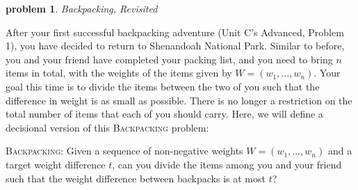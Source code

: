 \documentclass[10pt]{article}
\newtheorem{problem}{\sc\color{cit}problem}
\begin{document}
\begin{problem} Backpacking, Revisited \end{problem}
After your first successful backpacking adventure (Unit C's Advanced, Problem 1), you have decided to return to
Shenandoah National Park. Similar to before, you and your friend have completed your packing list, and you need
to bring $n$ items in total, with the weights of the items given by $W = (w_1, \ldots, w_n)$. Your goal
this time is to divide the items between the two of you such that the difference in weight is as small as possible.
There is no longer a restriction on the total number of items that each of you should carry.
Here, we will define a decisional version of this \textsc{Backpacking} problem:
\begin{framed}
  \noindent
  \textsc{Backpacking}: Given a sequence of non-negative weights $W = (w_1, \ldots, w_n)$ and a target weight difference
  $t$, can you divide the items among you and your friend such that the weight difference between backpacks is at most $t$?
\end{framed}
\end{document}
